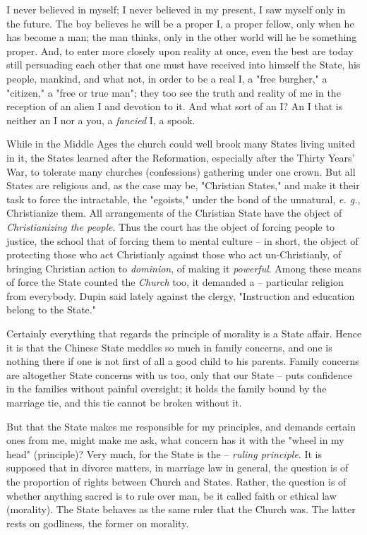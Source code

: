 \documentclass[a4paper]{book}
\begin{document}
I never believed in myself; I never believed in my present, I saw myself only 
in the future. The boy believes he will be a proper I, a proper fellow, only 
when he has become a man; the man thinks, only in the other world will he be 
something proper. And, to enter more closely upon reality at once, even the 
best are today still persuading each other that one must have received into 
himself the State, his people, mankind, and what not, in order to be a real I, 
a "{}free burgher,"{} a "{}citizen,"{} a "{}free or true man"{}; they too see 
the truth and reality of me in the reception of an alien I and devotion to it. 
And what sort of an I? An I that is neither an I nor a you, a \textit{fancied} 
I, a spook.

While in the Middle Ages the church could well brook many States living united 
in it, the States learned after the Reformation, especially after the Thirty 
Years' War, to tolerate many churches (confessions) gathering under one crown. 
But all States are religious and, as the case may be, "{}Christian States,"{} 
and make it their task to force the intractable, the "{}egoists,"{} under the 
bond of the unnatural, \textit{e. g.}, Christianize them. All arrangements of 
the Christian State have the object of \textit{Christianizing the people}. 
Thus the court has the object of forcing people to justice, the school that of 
forcing them to mental culture -- in short, the object of protecting those who 
act Christianly against those who act un-Christianly, of bringing Christian 
action to \textit{dominion}, of making it \textit{powerful}. Among these means 
of force the State counted the \textit{Church} too, it demanded a -- 
particular religion from everybody. Dupin said lately against the clergy, 
"{}Instruction and education belong to the State."{}

Certainly everything that regards the principle of morality is a State affair. 
Hence it is that the Chinese State meddles so much in family concerns, and one 
is nothing there if one is not first of all a good child to his parents. 
Family concerns are altogether State concerns with us too, only that our State 
-- puts confidence in the families without painful oversight; it holds the 
family bound by the marriage tie, and this tie cannot be broken without it.

But that the State makes me responsible for my principles, and demands certain 
ones from me, might make me ask, what concern has it with the "{}wheel in my 
head"{} (principle)? Very much, for the State is the -- \textit{ruling 
principle}. It is supposed that in divorce matters, in marriage law in 
general, the question is of the proportion of rights between Church and 
States. Rather, the question is of whether anything sacred is to rule over 
man, be it called faith or ethical law (morality). The State behaves as the 
same ruler that the Church was. The latter rests on godliness, the former on 
morality.
\end{document}
